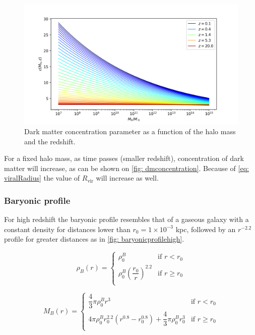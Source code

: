 		\begin{figure}[h]
			\centering
			\includegraphics[width=0.7\linewidth]{"../Files/Week 3/darkmatter_concentration"}
			\caption{Dark matter concentration parameter as a function of the halo mass and the redshift.}
			\label{fig: dmconcentration}
		\end{figure}
	
		For a fixed halo mass, as time passes (smaller redshift), concentration of dark matter will increase, as can be shown on \autoref{fig: dmconcentration}. Because of \autoref{eq: viralRadius} the value of $R_\text{vir}$ will increase as well.
	
		\subsubsection{Baryonic profile}
			For high redshift the baryonic profile resembles that of a gaseous galaxy with a constant density for distances lower than $r_0 = 1\times10^{-3}$ kpc, followed by an $r^{-2.2}$ profile for greater distances as in \autoref{fig: baryonicprofilehigh}.
			
			\begin{equation}
				\rho_B(r) = \left \{
				\begin{matrix}
				\rho_0^B & \text{if $r < r_0$}\\
				\rho_0^B\left(\dfrac{r_0}{r}\right)^{2.2} & \text{if $r \geq r_0$}\\
				\end{matrix}
				\right.
			\end{equation}
			
			\begin{equation}
				M_B(r) = \left \{
				\begin{matrix}
				\dfrac{4}{3}\pi\rho_0^Br^3 & \text{if $r < r_0$}\\
				4\pi\rho_0^Br_0^{2.2} \left(r^{0.8} - r_0^{0.8}\right) + \dfrac{4}{3}\pi\rho_0^Br_0^3 & \text{if $r \geq r_0$} \\
				\end{matrix}
				\right.
			\end{equation}
			
